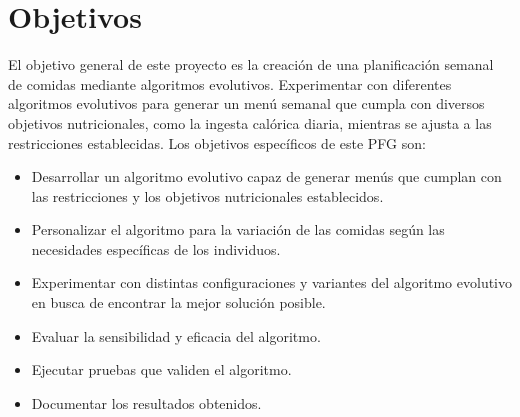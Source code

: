 \section{Objetivos}
\label{ch:objetivos}

El objetivo general de este proyecto es la creación de una planificación semanal de comidas mediante algoritmos evolutivos. Experimentar con diferentes algoritmos evolutivos para generar un menú semanal que cumpla con diversos objetivos nutricionales, como la ingesta calórica diaria, mientras se ajusta a las restricciones establecidas. Los objetivos específicos de este PFG son:

\begin{itemize}
    \item Desarrollar un algoritmo evolutivo capaz de generar menús que cumplan con las restricciones y los objetivos nutricionales establecidos.
    \item Personalizar el algoritmo para la variación de las comidas según las necesidades específicas de los individuos.
    \item Experimentar con distintas configuraciones y variantes del algoritmo evolutivo en busca de encontrar la mejor solución posible.
    \item Evaluar la sensibilidad y eficacia del algoritmo.
    \item Ejecutar pruebas que validen el algoritmo.
    \item Documentar los resultados obtenidos.
\end{itemize}

